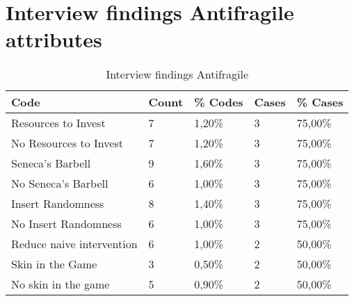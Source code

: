 \section{Interview findings Antifragile attributes}
\label{sec:interviewresultsantifragile}
\begin{table}[H]
	\centering
	\begin{tabular}{lllll}
		\toprule
		\textbf{Code} & \textbf{Count} & \textbf{\% Codes} & \textbf{Cases} & \textbf{\% Cases} \\
		\midrule
		Resources to Invest & 7     & 1,20\% & 3     & 75,00\% \\
		No Resources to Invest & 7     & 1,20\% & 3     & 75,00\% \\
		Seneca's Barbell & 9     & 1,60\% & 3     & 75,00\% \\
		No Seneca's Barbell & 6     & 1,00\% & 3     & 75,00\% \\
		Insert Randomness & 8     & 1,40\% & 3     & 75,00\% \\
		No Insert Randomness & 6     & 1,00\% & 3     & 75,00\% \\
		Reduce naive intervention & 6     & 1,00\% & 2     & 50,00\% \\
		Skin in the Game & 3     & 0,50\% & 2     & 50,00\% \\
		No skin in the game & 5     & 0,90\% & 2     & 50,00\% \\
		\bottomrule
	\end{tabular}%
	\caption{Interview findings Antifragile}
	\label{tab:interviewresultsantifragile}%
\end{table}%
